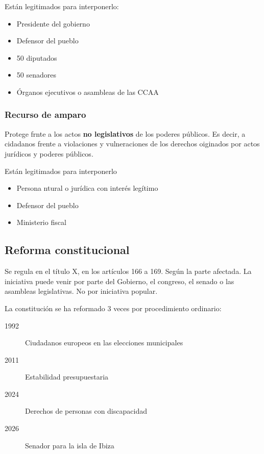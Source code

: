         Están legitimados para interponerlo:
        \begin{itemize}
            \item Presidente del gobierno
            \item Defensor del pueblo
            \item 50 diputados
            \item 50 senadores
            \item Órganos ejecutivos o asambleas de las CCAA
        \end{itemize}

    \subsubsection{Recurso de amparo}
        Protege frnte a los actos \textbf{no legislativos} de los poderes públicos. Es decir, a cidadanos frente a violaciones y vulneraciones de los derechos oiginados por actos jurídicos y poderes públicos.

        Están legitimados para interponerlo
        \begin{itemize}
            \item Persona ntural o jurídica con interés legítimo
            \item Defensor del pueblo
            \item Ministerio fiscal
        \end{itemize}

\subsection{Reforma constitucional}
    Se regula en el título X, en los artículos 166 a 169. Según la parte afectada. 
    La iniciativa puede venir por parte del Gobierno, el congreso, el senado o las asambleas legislativas. No por iniciativa popular.
    
    La constitución se ha reformado 3 veces por procedimiento ordinario:
    \begin{description}
        \item[1992] Ciudadanos europeos en las elecciones municipales
        \item[2011] Estabilidad presupuestaria
        \item[2024] Derechos de personas con discapacidad
        \item[2026] Senador para la isla de Ibiza 
    \end{description}

